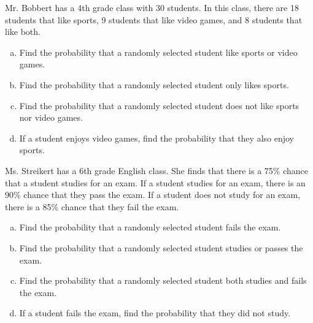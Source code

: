 \documentclass[11pt,letterpaper]{article}
\begin{document}
\newpage



 Mr. Bobbert has a 4th grade class with 30 students. In this class, there are 18 students that like sports, 9 students that like video games, and 8 students that like both.
	\begin{enumerate}[(a)]
	\item Find the probability that a randomly selected student like sports or video games.
	\item Find the probability that a randomly selected student only likes sports. 
	\item Find the probability that a randomly selected student does not like sports nor video games.
	\item If a student enjoys video games, find the probability that they also enjoy sports. 
	\end{enumerate}



\newpage



 Ms. Streikert has a 6th grade English class. She finds that there is a 75\% chance that a student studies for an exam. If a student studies for an exam, there is an 90\% chance that they pass the exam. If a student does not study for an exam, there is a 85\% chance that they fail the exam. 
	\begin{enumerate}[(a)]
	\item Find the probability that a randomly selected student fails the exam.
	\item Find the probability that a randomly selected student studies or passes the exam.
	\item Find the probability that a randomly selected student both studies and fails the exam.
	\item If a student fails the exam, find the probability that they did not study. 
	\end{enumerate} 
\end{document}
